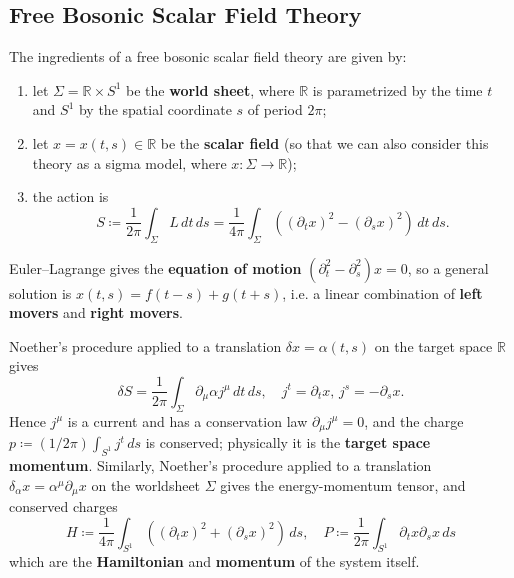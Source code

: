 \documentclass{report}
\theoremstyle{plain}
\theoremstyle{definition}
\theoremstyle{remark}
\newcommand{\di}{\partial}
\newcommand{\bR}{\mathbb{R}}
\begin{document}
\subsection{Free Bosonic Scalar Field Theory}

The ingredients of a free bosonic scalar field theory are given by:
\begin{enumerate}
\item let $\Sigma = \bR \times S^1$ be the {\bf world sheet}, where
  $\bR$ is parametrized by the time $t$ and $S^1$ by the spatial
  coordinate $s$ of period $2\pi$;
\item let $x = x(t, s) \in \bR$ be the {\bf scalar field} (so that we
  can also consider this theory as a sigma model, where $x\colon
  \Sigma \to \bR$);
\item the action is
  \[ S \coloneqq \frac{1}{2\pi} \int_\Sigma L \, dt \, ds = \frac{1}{4\pi} \int_\Sigma \left((\di_t x)^2 - (\di_s x)^2\right) \, dt \, ds. \]
\end{enumerate}
Euler--Lagrange gives the {\bf equation of motion} $(\di_t^2 -
\di_s^2)x = 0$, so a general solution is $x(t, s) = f(t - s) + g(t +
s)$, i.e. a linear combination of {\bf left movers} and {\bf right
  movers}.

Noether's procedure applied to a translation $\delta x = \alpha(t, s)$
on the target space $\bR$ gives
\[ \delta S = \frac{1}{2\pi} \int_\Sigma \di_\mu\alpha j^\mu \, dt \, ds, \quad j^t = \di_t x, \, j^s = -\di_s x. \]
Hence $j^\mu$ is a current and has a conservation law $\di_\mu j^\mu =
0$, and the charge $p \coloneqq (1/2\pi) \int_{S^1} j^t \, ds$ is
conserved; physically it is the {\bf target space momentum}.
Similarly, Noether's procedure applied to a translation $\delta_\alpha
x = \alpha^\mu \di_\mu x$ on the worldsheet $\Sigma$ gives the
energy-momentum tensor, and conserved charges
\[ H \coloneqq \frac{1}{4\pi} \int_{S^1} \left((\di_t x)^2 + (\di_s x)^2\right) \, ds, \quad P \coloneqq \frac{1}{2\pi} \int_{S^1} \di_t x \di_s x \, ds \]
which are the {\bf Hamiltonian} and {\bf momentum} of the system
itself.
\end{document}
